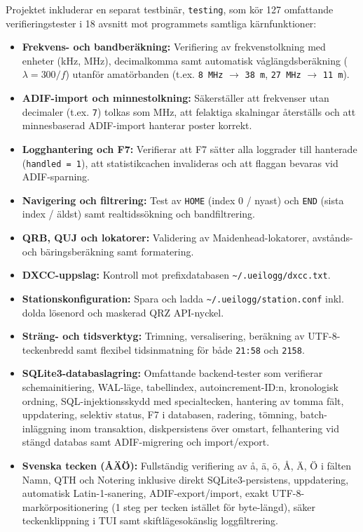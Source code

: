 \documentclass[11pt,a4paper]{article}
\begin{document}
Projektet inkluderar en separat testbinär, \texttt{testing}, som kör 127 omfattande verifieringstester i 18 avsnitt mot programmets samtliga kärnfunktioner:
\begin{itemize}
    \item \textbf{Frekvens- och bandberäkning:} Verifiering av frekvenstolkning med enheter (kHz, MHz), decimalkomma samt automatisk våglängdsberäkning ($\lambda = 300 / f$) utanför amatörbanden (t.ex. \texttt{8 MHz} $\rightarrow$ \texttt{38 m}, \texttt{27 MHz} $\rightarrow$ \texttt{11 m}).
    \item \textbf{ADIF-import och minnestolkning:} Säkerställer att frekvenser utan decimaler (t.ex. \texttt{7}) tolkas som MHz, att felaktiga skalningar återställs och att minnesbaserad ADIF-import hanterar poster korrekt.
    \item \textbf{Logghantering och F7:} Verifierar att F7 sätter alla loggrader till hanterade (\texttt{handled = 1}), att statistikcachen invalideras och att flaggan bevaras vid ADIF-sparning.
    \item \textbf{Navigering och filtrering:} Test av \texttt{HOME} (index 0 / nyast) och \texttt{END} (sista index / äldst) samt realtidssökning och bandfiltrering.
    \item \textbf{QRB, QUJ och lokatorer:} Validering av Maidenhead-lokatorer, avstånds- och bäringsberäkning samt formatering.
    \item \textbf{DXCC-uppslag:} Kontroll mot prefixdatabasen \texttt{\textasciitilde/.ueilogg/dxcc.txt}.
    \item \textbf{Stationskonfiguration:} Spara och ladda \texttt{\textasciitilde/.ueilogg/station.conf} inkl. dolda lösenord och maskerad QRZ API-nyckel.
    \item \textbf{Sträng- och tidsverktyg:} Trimning, versalisering, beräkning av UTF-8-teckenbredd samt flexibel tidsinmatning för både \texttt{21:58} och \texttt{2158}.
    \item \textbf{SQLite3-databaslagring:} Omfattande backend-tester som verifierar schemainitiering, WAL-läge, tabellindex, autoincrement-ID:n, kronologisk ordning, SQL-injektionsskydd med specialtecken, hantering av tomma fält, uppdatering, selektiv status, F7 i databasen, radering, tömning, batch-inläggning inom transaktion, diskpersistens över omstart, felhantering vid stängd databas samt ADIF-migrering och import/export.
    \item \textbf{Svenska tecken (ÅÄÖ):} Fullständig verifiering av å, ä, ö, Å, Ä, Ö i fälten Namn, QTH och Notering inklusive direkt SQLite3-persistens, uppdatering, automatisk Latin-1-sanering, ADIF-export/import, exakt UTF-8-markörpositionering (1 steg per tecken istället för byte-längd), säker teckenklippning i TUI samt skiftlägesokänslig loggfiltrering.

\end{itemize}
\end{document}
